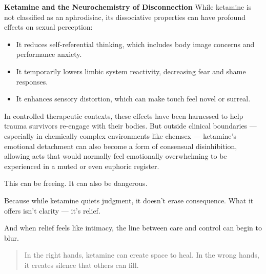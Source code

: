 \begin{TechnicalSidebar}{\textbf{Ketamine and the Neurochemistry of Disconnection}}
  While ketamine is not classified as an aphrodisiac, its dissociative properties can have profound effects 
  on sexual perception:

  \medskip
  
  \begin{itemize}
  \item It reduces self-referential thinking, which includes body image concerns and performance anxiety.
  \item It temporarily lowers limbic system reactivity, decreasing fear and shame responses.
  \item It enhances sensory distortion, which can make touch feel novel or surreal.
  \end{itemize}

  \medskip
  
  In controlled therapeutic contexts, these effects have been harnessed to help trauma survivors re-engage 
  with their bodies. But outside clinical boundaries — especially in chemically complex environments like 
  chemsex — ketamine’s emotional detachment can also become a form of consensual disinhibition, allowing 
  acts that would normally feel emotionally overwhelming to be experienced in a muted or even euphoric 
  register.
  
  \medskip
  
  This can be freeing.
  It can also be dangerous.

  \medskip
  
  Because while ketamine quiets judgment, it doesn’t erase consequence. What it offers isn’t clarity 
  — it’s relief.

  \medskip
  
  And when relief feels like intimacy, the line between care and control can begin to blur.
  
  \begin{quote}
    In the right hands, ketamine can create space to heal.  
    In the wrong hands, it creates silence that others can fill.
  \end{quote}
  
\end{TechnicalSidebar}
